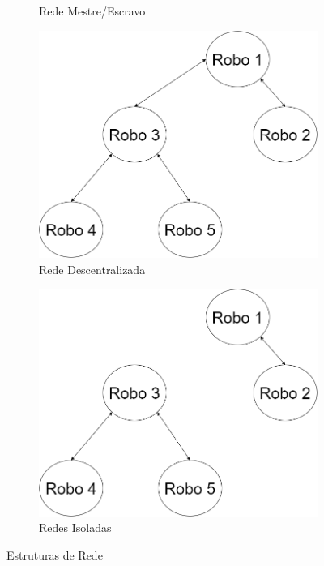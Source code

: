 \begin{figure}[!htb]
\begin{subfigure}{.5\textwidth}
		\caption{Rede Mestre/Escravo}
		\label{fig:redenxt}
	\end{subfigure}
	\begin{subfigure}{.45\textwidth}
		\centering
		\includegraphics[width=.9\linewidth]{./04-figuras/RedeDistribuida}
		\caption{Rede Descentralizada}
		\label{fig:rededistr}
	\end{subfigure}
	\begin{subfigure}{.45\textwidth}
		\centering
		\includegraphics[width=.9\linewidth]{./04-figuras/RedeIsolada}
		\caption{Redes Isoladas}
		\label{fig:redeisolada}
	\end{subfigure}
	\caption{Estruturas de Rede}
	\label{fig:redes}
\end{figure}

